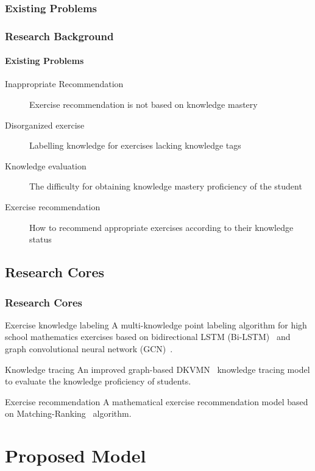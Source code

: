 \documentclass{beamer}
\begin{document}
\subsubsection{Existing Problems}
\begin{frame}
	\frametitle{Research Background}
	\framesubtitle{Existing Problems}
	\begin{description}
		\item[Inappropriate Recommendation] Exercise recommendation is not based on knowledge mastery
		\item[Disorganized exercise] Labelling knowledge for exercises lacking knowledge tags
		\item[Knowledge evaluation] The difficulty for obtaining knowledge mastery proficiency of the student
		\item[Exercise recommendation] How to recommend appropriate exercises according to their knowledge status
	\end{description}
\end{frame}
\subsection{Research Cores}
\begin{frame}
	\frametitle{Research Cores}
	\begin{block}{Exercise knowledge labeling}
		A multi-knowledge point labeling algorithm for high school mathematics exercises based on bidirectional LSTM (Bi-LSTM)~\cite{chen2017improving} and graph convolutional neural network (GCN)~\cite{kipf2016semi}.
	\end{block}
	\begin{block}{Knowledge tracing}
		An improved graph-based DKVMN~\cite{zhang2017dynamic} knowledge tracing model to evaluate the knowledge proficiency of students.
	\end{block}
	\begin{block}{Exercise recommendation}
		A mathematical exercise recommendation model based on Matching-Ranking~\cite{segev2009context} algorithm.
	\end{block}
\end{frame}
\section{Proposed Model}
\end{document}
